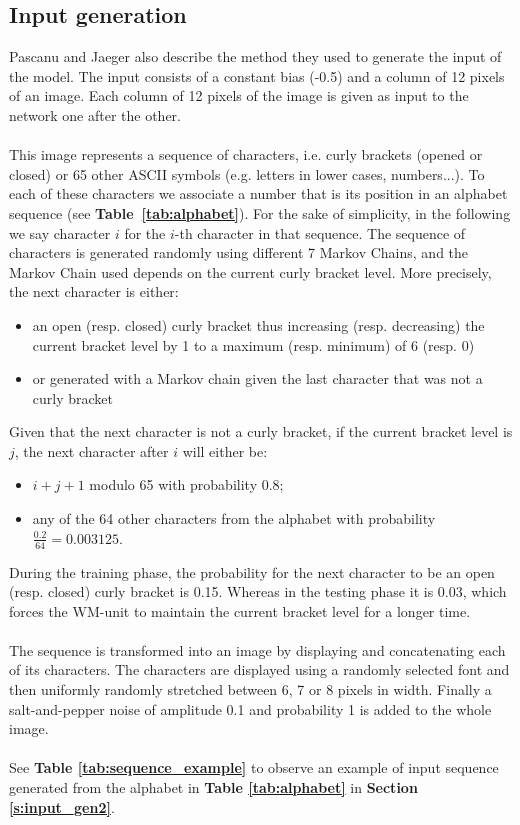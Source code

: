 \subsection{Input generation}

Pascanu and Jaeger also describe the method they used to generate the input of the model.
The input consists of a constant bias (-0.5) and a column of 12 pixels of an image.
Each column of 12 pixels of the image is given as input to the network one after the other. \\
\\
This image represents a sequence of characters, i.e. curly brackets (opened or closed) or 65 other ASCII symbols (e.g. letters in lower cases, numbers...).
To each of these characters we associate a number that is its position in an alphabet sequence (see \textbf{Table~\ref{tab:alphabet}}).
For the sake of simplicity, in the following we say character $i$ for the $i$-th character in that sequence.
The sequence of characters is generated randomly using different 7 Markov Chains, and the Markov Chain used depends on the current curly bracket level.
More precisely, the next character is either:
\begin{itemize}
    \item an open (resp. closed) curly bracket thus increasing (resp. decreasing) the current bracket level by 1 to a maximum (resp. minimum) of 6 (resp. 0)
    \item or generated with a Markov chain given the last character that was not a curly bracket
\end{itemize}
Given that the next character is not a curly bracket, if the current bracket level is $\mathit{j}$, the next character after $\mathit{i}$ will either be:
\begin{itemize}
    \item $\mathit{i} + \mathit{j} + 1$ modulo 65 with probability $0.8$;
    \item any of the 64 other characters from the alphabet with probability $\frac{0.2}{64} = 0.003125
$.
\end{itemize}
During the training phase, the probability for the next character to be an open (resp. closed) curly bracket is 0.15.
Whereas in the testing phase it is 0.03, which forces the WM-unit to maintain the current bracket level for a longer time. \\
\\
The sequence is transformed into an image by displaying and concatenating each of its characters.
The characters are displayed using a randomly selected font and then uniformly randomly stretched between 6, 7 or 8 pixels in width.
Finally a salt-and-pepper noise of amplitude 0.1 and probability 1 is added to the whole image.\\
\\
See \textbf{Table \ref{tab:sequence_example}} to observe an example of input sequence generated from the alphabet in \textbf{Table \ref{tab:alphabet}} in \textbf{Section \ref{s:input_gen2}}.

